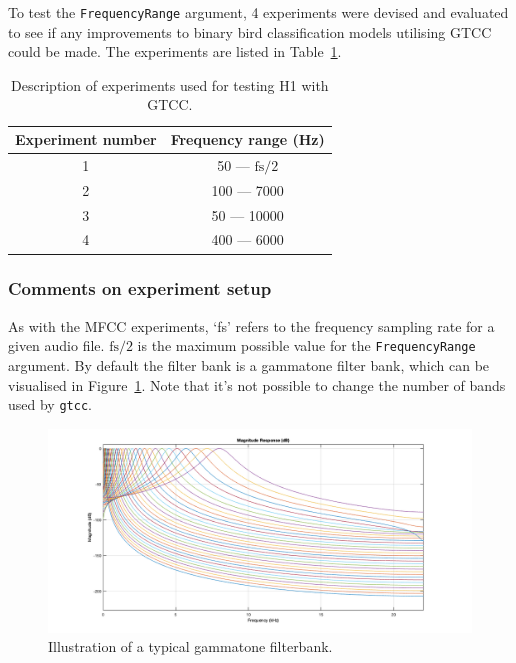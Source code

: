 To test the \texttt{FrequencyRange} argument, 4 experiments were devised and
evaluated to see if any improvements to binary bird classification
models utilising GTCC could be made. The experiments are listed in
Table~\ref{table:h1_gtcc_experiments}.

\begin{table}[ht]
\begin{center}
\begin{tabular}{c c}
\toprule
Experiment number & Frequency range (Hz) \\ [0.5ex]
\midrule
1 & 50 --- $\text{fs}/2$ \\
2 & 100 --- 7000 \\
3 & 50 --- 10000 \\
4 & 400 --- 6000 \\
\bottomrule
\end{tabular}
\caption{Description of experiments used for testing H1 with
GTCC.}\label{table:h1_gtcc_experiments}
\end{center}
\end{table}

\subsubsection{Comments on experiment setup}

As with the MFCC experiments, `fs' refers to the frequency sampling rate for a
given audio file. $\text{fs}/2$ is the maximum possible value for the
\texttt{FrequencyRange} argument. By default the filter bank is a gammatone
filter bank, which can be visualised in Figure~\ref{fig:gammatone_filterbank}.
Note that it's not possible to change the number of bands used by \texttt{gtcc}.

\begin{figure}[ht]
  \centering
  \includegraphics[width=\textwidth]{figures/gammatone_filterbank.png}
  \caption{Illustration of a typical gammatone
  filterbank.}\label{fig:gammatone_filterbank}
\end{figure}

